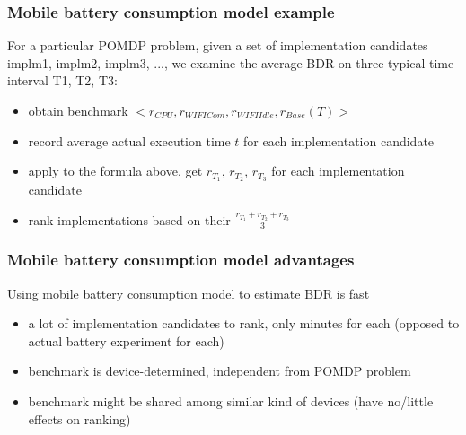 \documentclass{beamer}
\begin{document}
\begin{frame}
\frametitle{Mobile battery consumption model example}
For a particular POMDP problem, given a set of implementation candidates implm1, implm2, implm3, ..., we examine the average BDR on three typical time interval T1, T2, T3:
\begin{itemize}
\item obtain benchmark $<r_{CPU},r_{WIFICom},r_{WIFIIdle},r_{Base}(T)>$
\item record average actual execution time $t$ for each implementation candidate
\item apply to the formula above, get $r_{T_1}$, $r_{T_2}$, $r_{T_3}$ for each implementation candidate
\item rank implementations based on their $\frac{r_{T_1}+r_{T_2}+r_{T_3}}{3}$
\end{itemize}
\end{frame}

\begin{frame}
\frametitle{Mobile battery consumption model advantages}
Using mobile battery consumption model to estimate BDR is fast
\begin{itemize}
\item a lot of implementation candidates to rank, only minutes for each (opposed to actual battery experiment for each)
\item benchmark is device-determined, independent from POMDP problem
\item benchmark might be shared among similar kind of devices (have no/little effects on ranking)
\end{itemize}
\end{frame}
\end{document}
